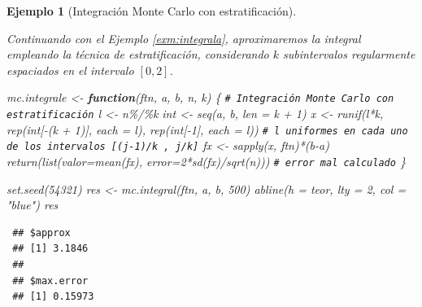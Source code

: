 \documentclass[
  10pt,
]{book}
\newenvironment{Shaded}{\begin{snugshade}}{\end{snugshade}}
\newcommand{\AttributeTok}[1]{\textcolor[rgb]{0.77,0.63,0.00}{#1}}
\newcommand{\CommentTok}[1]{\textcolor[rgb]{0.56,0.35,0.01}{\textit{#1}}}
\newcommand{\ControlFlowTok}[1]{\textcolor[rgb]{0.13,0.29,0.53}{\textbf{#1}}}
\newcommand{\DecValTok}[1]{\textcolor[rgb]{0.00,0.00,0.81}{#1}}
\newcommand{\FunctionTok}[1]{\textcolor[rgb]{0.00,0.00,0.00}{#1}}
\newcommand{\NormalTok}[1]{#1}
\newcommand{\OtherTok}[1]{\textcolor[rgb]{0.56,0.35,0.01}{#1}}
\newcommand{\SpecialCharTok}[1]{\textcolor[rgb]{0.00,0.00,0.00}{#1}}
\newcommand{\StringTok}[1]{\textcolor[rgb]{0.31,0.60,0.02}{#1}}
\theoremstyle{break}
\newtheorem{example}{Ejemplo}[chapter]
\theoremstyle{nonumberplain}
\renewcommand{\CommentTok}[1]{\textcolor[rgb]{0.41,0.41,0.41}{\texttt{#1}}}
\begin{document}
\begin{example}[Integración Monte Carlo con estratificación]
\protect\hypertarget{exm:integrale}{}\label{exm:integrale}

Continuando con el Ejemplo \ref{exm:integrala}, aproximaremos la integral empleando la técnica de estratificación, considerando \(k\) subintervalos regularmente espaciados en el intervalo \(\left[ 0, 2 \right]\).

\begin{Shaded}
\begin{Highlighting}[]
\NormalTok{mc.integrale }\OtherTok{\textless{}{-}} \ControlFlowTok{function}\NormalTok{(ftn, a, b, n, k) \{}
  \CommentTok{\# Integración Monte Carlo con estratificación}
\NormalTok{  l }\OtherTok{\textless{}{-}}\NormalTok{ n}\SpecialCharTok{\%/\%}\NormalTok{k}
\NormalTok{  int }\OtherTok{\textless{}{-}} \FunctionTok{seq}\NormalTok{(a, b, }\AttributeTok{len =}\NormalTok{ k }\SpecialCharTok{+} \DecValTok{1}\NormalTok{)}
\NormalTok{  x }\OtherTok{\textless{}{-}} \FunctionTok{runif}\NormalTok{(l}\SpecialCharTok{*}\NormalTok{k, }\FunctionTok{rep}\NormalTok{(int[}\SpecialCharTok{{-}}\NormalTok{(k }\SpecialCharTok{+} \DecValTok{1}\NormalTok{)], }\AttributeTok{each =}\NormalTok{ l), }\FunctionTok{rep}\NormalTok{(int[}\SpecialCharTok{{-}}\DecValTok{1}\NormalTok{], }\AttributeTok{each =}\NormalTok{ l))}
  \CommentTok{\# l uniformes en cada uno de los intervalos [(j{-}1)/k , j/k]}
\NormalTok{  fx }\OtherTok{\textless{}{-}} \FunctionTok{sapply}\NormalTok{(x, ftn)}\SpecialCharTok{*}\NormalTok{(b}\SpecialCharTok{{-}}\NormalTok{a)}
  \FunctionTok{return}\NormalTok{(}\FunctionTok{list}\NormalTok{(}\AttributeTok{valor=}\FunctionTok{mean}\NormalTok{(fx), }\AttributeTok{error=}\DecValTok{2}\SpecialCharTok{*}\FunctionTok{sd}\NormalTok{(fx)}\SpecialCharTok{/}\FunctionTok{sqrt}\NormalTok{(n)))   }\CommentTok{\# error mal calculado}
\NormalTok{\}}

\FunctionTok{set.seed}\NormalTok{(}\DecValTok{54321}\NormalTok{)}
\NormalTok{res }\OtherTok{\textless{}{-}} \FunctionTok{mc.integral}\NormalTok{(ftn, a, b, }\DecValTok{500}\NormalTok{)}
\FunctionTok{abline}\NormalTok{(}\AttributeTok{h =}\NormalTok{ teor, }\AttributeTok{lty =} \DecValTok{2}\NormalTok{, }\AttributeTok{col =} \StringTok{"blue"}\NormalTok{)}
\NormalTok{res}
\end{Highlighting}
\end{Shaded}

\begin{verbatim}
 ## $approx
 ## [1] 3.1846
 ## 
 ## $max.error
 ## [1] 0.15973
\end{verbatim}


\end{example}
\end{document}
